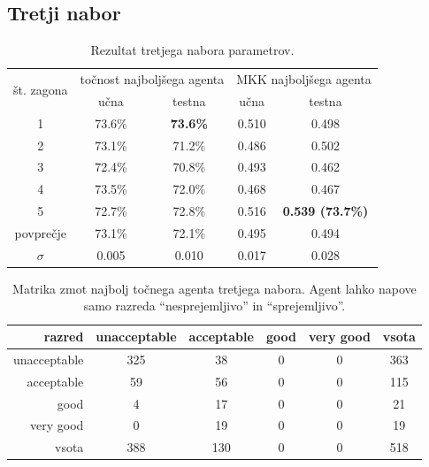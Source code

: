 \subsection{Tretji nabor}\label{subsec:dodatek-car-tretji-nabor}
\begin{table}[H]
    \begin{center}
        \begin{tabular}{|| c | c c || c c ||}
            \hline
            \multirow{2}{*}{št. zagona} & \multicolumn{2}{c||}{točnost najboljšega agenta} & \multicolumn{2}{c||}{MKK najboljšega agenta} \\ \cline{2-5}
            & učna   & testna          & učna  & testna                  \\
            \hline
            1         & 73.6\% & \textbf{73.6\%} & 0.510 & 0.498                   \\
            \hline
            2         & 73.1\% & 71.2\%          & 0.486 & 0.502                   \\
            \hline
            3         & 72.4\% & 70.8\%          & 0.493 & 0.462                   \\
            \hline
            4         & 73.5\% & 72.0\%          & 0.468 & 0.467                   \\
            \hline
            5         & 72.7\% & 72.8\%          & 0.516 & \textbf{0.539 (73.7\%)} \\
            \hline
            povprečje & 73.1\% & 72.1\%          & 0.495 & 0.494                   \\
            \hline
            $\sigma$  & 0.005  & 0.010           & 0.017 & 0.028                   \\
            \hline
        \end{tabular}
    \end{center}
    \caption{Rezultat tretjega nabora parametrov.}
    \label{tab:car_result_3}
\end{table}

\begin{table}[H]
    \centering
    \begin{tabular}{||rccccc||}
        \hline
        razred       & unacceptable & acceptable & good & very good & vsota \\ \hline
        unacceptable & 325          & 38         & 0    & 0         & 363   \\ \hline
        acceptable   & 59           & 56         & 0    & 0         & 115   \\ \hline
        good         & 4            & 17         & 0    & 0         & 21    \\ \hline
        very good    & 0            & 19         & 0    & 0         & 19    \\ \hline
        vsota        & 388          & 130        & 0    & 0         & 518   \\ \hline
    \end{tabular}
    \caption{Matrika zmot najbolj točnega agenta tretjega nabora. Agent lahko napove samo razreda \enquote{nesprejemljivo} in \enquote{sprejemljivo}.}
    \label{tab:car_acc_3}
\end{table}

